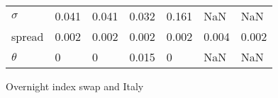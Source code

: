 \begin{table}[H]
\begin{adjustbox}{width=\textwidth}
\begin{tabular}{lllllll}
	$\sigma$  &               0.041 &               0.041 &               0.032 &               0.161 &                 NaN &                 NaN \\
	spread &               0.002 &               0.002 &               0.002 &               0.002 &               0.004 &               0.002 \\
	$\theta$  &                   0 &                   0 &               0.015 &                   0 &                 NaN &                 NaN \\
	\bottomrule
\end{tabular}
		
	\end{adjustbox}
	
\end{table}

\begin{table}[H]
	\centering
	\caption{Overnight index swap and Italy}
	\label{ois_italy}
	
	\begin{adjustbox}{width=\textwidth}
		

\end{adjustbox}
\end{table}
